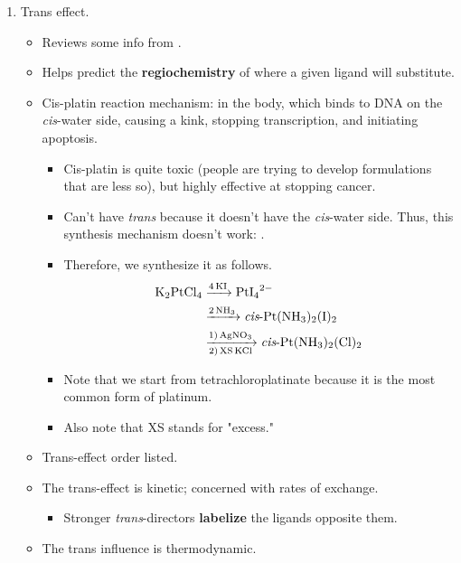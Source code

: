 \documentclass[../notes.tex]{subfiles}
\begin{document}
\begin{itemize}
\begin{enumerate}
        \item Trans effect.
        \begin{itemize}
            \item Reviews some info from \textcite{bib:CHEM20100Notes}.
            \item Helps predict the \textbf{regiochemistry} of where a given ligand will substitute.
            \item Cis-platin reaction mechanism:  in the body, which binds to DNA on the \emph{cis}-water side, causing a kink, stopping transcription, and initiating apoptosis.
            \begin{itemize}
                \item Cis-platin is quite toxic (people are trying to develop formulations that are less so), but highly effective at stopping cancer.
                \item Can't have \emph{trans} because it doesn't have the \emph{cis}-water side. Thus, this synthesis mechanism doesn't work: .
                \item Therefore, we synthesize it as follows.
                \begin{align*}
                    \ce{K2PtCl4} &\ce{->[4KI]} \ce{PtI4^2-}\\
                    &\ce{->[2NH3]} \ce{{\emph{cis}-}Pt(NH3)2(I)2}\\
                    &\ce{->[1) AgNO3][2) XS KCl]} \ce{{\emph{cis}-}Pt(NH3)2(Cl)2}
                \end{align*}
                \item Note that we start from tetrachloroplatinate because it is the most common form of platinum.
                \item Also note that XS stands for "excess."
            \end{itemize}
            \item Trans-effect order listed.
            \item The trans-effect is kinetic; concerned with rates of exchange.
            \begin{itemize}
                \item Stronger \emph{trans}-directors \textbf{labelize} the ligands opposite them.
            \end{itemize}
            \item The trans influence is thermodynamic.
            \begin{itemize}

\end{itemize}
\end{itemize}
\end{enumerate}
\end{itemize}
\end{document}
